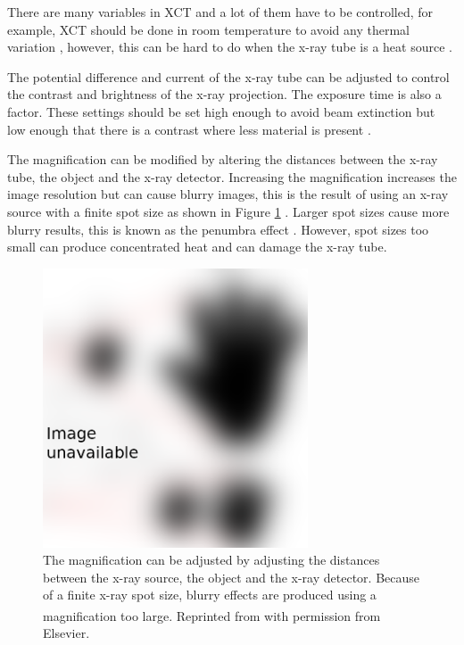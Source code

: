 There are many variables in XCT and a lot of them have to be controlled, for example, XCT should be done in room temperature to avoid any thermal variation \citep{bryan1990international}, however, this can be hard to do when the x-ray tube is a heat source \citep{kruth2011computed}.

The potential difference and current of the x-ray tube can be adjusted to control the contrast and brightness of the x-ray projection. The exposure time is also a factor. These settings should be set high enough to avoid beam extinction but low enough that there is a contrast where less material is present \citep{kruth2011computed}.

The magnification can be modified by altering the distances between the x-ray tube, the object and the x-ray detector. Increasing the magnification increases the image resolution but can cause blurry images, this is the result of using an x-ray source with a finite spot size as shown in Figure \ref{fig:literature_magnification} \citep{kruth2011computed}. Larger spot sizes cause more blurry results, this is known as the penumbra effect \citep{kueh2016modelling}. However, spot sizes too small can produce concentrated heat \citep{welkenhuyzen2009industrial} and can damage the x-ray tube.

\begin{figure}
  \centering
  \includegraphics[width=0.7\textwidth]{../figures/literatureReview/literature_magnification.png}
  \caption{The magnification can be adjusted by adjusting the distances between the x-ray source, the object and the x-ray detector. Because of a finite x-ray spot size, blurry effects are produced using a magnification too large. Reprinted from \cite{kruth2011computed}\textsuperscript{\textcopyright} with permission from Elsevier.}
  \label{fig:literature_magnification}
\end{figure}

